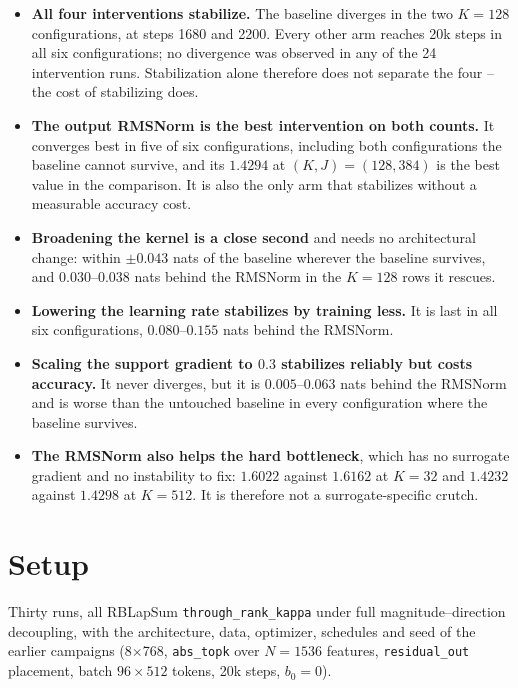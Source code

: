 \documentclass[11pt,a4paper]{article}
\newcommand{\code}[1]{\texttt{#1}}
\begin{document}
\begin{itemize}[leftmargin=1.4em]
\item \textbf{All four interventions stabilize.} The baseline diverges in
the two $K=128$ configurations, at steps 1680 and 2200. Every other arm
reaches 20k steps in all six configurations; no divergence was observed in
any of the 24 intervention runs. Stabilization alone therefore does not
separate the four -- the cost of stabilizing does.

\item \textbf{The output RMSNorm is the best intervention on both counts.}
It converges best in five of six configurations, including both
configurations the baseline cannot survive, and its $1.4294$ at
$(K,J)=(128,384)$ is the best value in the comparison. It is also the only
arm that stabilizes without a measurable accuracy cost.

\item \textbf{Broadening the kernel is a close second} and needs no
architectural change: within $\pm0.043$ nats of the baseline wherever the
baseline survives, and $0.030$--$0.038$ nats behind the RMSNorm in the
$K=128$ rows it rescues.

\item \textbf{Lowering the learning rate stabilizes by training less.} It
is last in all six configurations, $0.080$--$0.155$ nats behind the
RMSNorm.

\item \textbf{Scaling the support gradient to $0.3$ stabilizes reliably but
costs accuracy.} It never diverges, but it is $0.005$--$0.063$ nats behind
the RMSNorm and is worse than the untouched baseline in every
configuration where the baseline survives.

\item \textbf{The RMSNorm also helps the hard bottleneck}, which has no
surrogate gradient and no instability to fix: $1.6022$ against $1.6162$ at
$K=32$ and $1.4232$ against $1.4298$ at $K=512$. It is therefore not a
surrogate-specific crutch.
\end{itemize}

\section{Setup}

Thirty runs, all RBLapSum \code{through\_rank\_kappa} under full
magnitude--direction decoupling, with the architecture, data, optimizer,
schedules and seed of the earlier campaigns (8$\times$768, \code{abs\_topk}
over $N=1536$ features, \code{residual\_out} placement, batch
$96\times512$ tokens, 20k steps, $b_0=0$).
\end{document}
